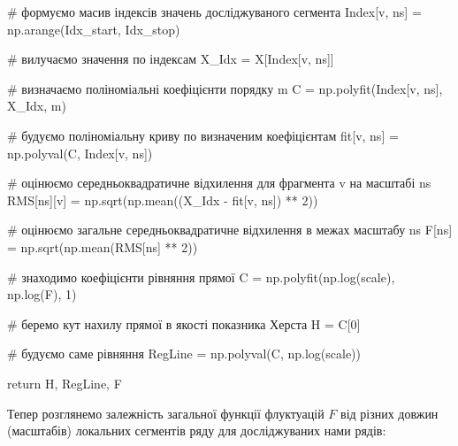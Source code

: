 \documentclass[
  letterpaper,
]{report}
\newenvironment{Shaded}{\begin{snugshade}}{\end{snugshade}}
\newcommand{\CommentTok}[1]{\textcolor[rgb]{0.37,0.37,0.37}{#1}}
\newcommand{\ControlFlowTok}[1]{\textcolor[rgb]{0.00,0.23,0.31}{#1}}
\newcommand{\DecValTok}[1]{\textcolor[rgb]{0.68,0.00,0.00}{#1}}
\newcommand{\NormalTok}[1]{\textcolor[rgb]{0.00,0.23,0.31}{#1}}
\newcommand{\OperatorTok}[1]{\textcolor[rgb]{0.37,0.37,0.37}{#1}}
\begin{document}
\begin{Shaded}
\begin{Highlighting}[]
            \CommentTok{\# формуємо масив індексів значень досліджуваного сегмента}
\NormalTok{            Index[v, ns] }\OperatorTok{=}\NormalTok{ np.arange(Idx\_start, Idx\_stop)  }

            \CommentTok{\# вилучаємо значення по індексам}
\NormalTok{            X\_Idx }\OperatorTok{=}\NormalTok{ X[Index[v, ns]]                       }

            \CommentTok{\# визначаємо поліноміальні коефіцієнти порядку m}
\NormalTok{            C }\OperatorTok{=}\NormalTok{ np.polyfit(Index[v, ns], X\_Idx, m) }
            
            \CommentTok{\# будуємо поліноміальну криву по визначеним коефіцієнтам}
\NormalTok{            fit[v, ns] }\OperatorTok{=}\NormalTok{ np.polyval(C, Index[v, ns])  }

            \CommentTok{\# оцінюємо середньоквадратичне відхилення для фрагмента v на масштабі ns }
\NormalTok{            RMS[ns][v] }\OperatorTok{=}\NormalTok{ np.sqrt(np.mean((X\_Idx }\OperatorTok{{-}}\NormalTok{ fit[v, ns]) }\OperatorTok{**} \DecValTok{2}\NormalTok{)) }

        \CommentTok{\# оцінюємо загальне середньоквадратичне відхилення в межах масштабу ns}
\NormalTok{        F[ns] }\OperatorTok{=}\NormalTok{ np.sqrt(np.mean(RMS[ns] }\OperatorTok{**} \DecValTok{2}\NormalTok{))}

    \CommentTok{\# знаходимо коефіцієнти рівняння прямої }
\NormalTok{    C }\OperatorTok{=}\NormalTok{ np.polyfit(np.log(scale), np.log(F), }\DecValTok{1}\NormalTok{) }
    
    \CommentTok{\# беремо кут нахилу прямої в якості показника Херста}
\NormalTok{    H }\OperatorTok{=}\NormalTok{ C[}\DecValTok{0}\NormalTok{]}

    \CommentTok{\# будуємо саме рівняння}
\NormalTok{    RegLine }\OperatorTok{=}\NormalTok{ np.polyval(C, np.log(scale))}

    \ControlFlowTok{return}\NormalTok{ H, RegLine, F}
\end{Highlighting}
\end{Shaded}

Тепер розглянемо залежність загальної функції флуктуацій \(F\) від
різних довжин (масштабів) локальних сегментів ряду для досліджуваних
нами рядів:
\end{document}
